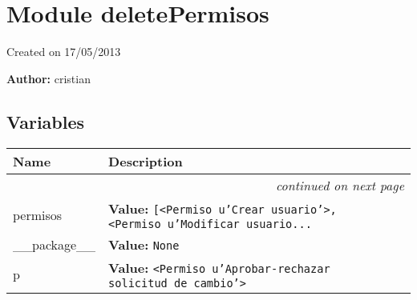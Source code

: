 %
%
%


\section{Module deletePermisos}

    \label{deletePermisos}
Created on 17/05/2013

\textbf{Author:} cristian





  \subsection{Variables}

    \vspace{-1cm}
\hspace{\varindent}\begin{longtable}{|p{\varnamewidth}|p{\vardescrwidth}|l}
\cline{1-2}
\cline{1-2} \centering \textbf{Name} & \centering \textbf{Description}& \\
\cline{1-2}
\endhead\cline{1-2}\multicolumn{3}{r}{\small\textit{continued on next page}}\\\endfoot\cline{1-2}
\endlastfoot\raggedright p\-e\-r\-m\-i\-s\-o\-s\- & \raggedright \textbf{Value:} 
{\tt \texttt{[}{\textless}Permiso u'Crear usuario'{\textgreater}\texttt{, }{\textless}Permiso u'Modificar usuario\texttt{...}}&\\
\cline{1-2}
\raggedright \_\-\_\-p\-a\-c\-k\-a\-g\-e\-\_\-\_\- & \raggedright \textbf{Value:} 
{\tt None}&\\
\cline{1-2}
\raggedright p\- & \raggedright \textbf{Value:} 
{\tt {\textless}Permiso u'Aprobar-rechazar solicitud de cambio'{\textgreater}}&\\
\cline{1-2}
\end{longtable}

